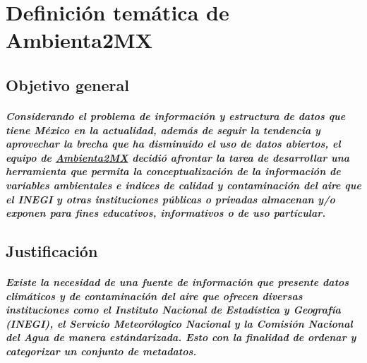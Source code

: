 \chapter {Definici\'on tem\'atica de Ambienta2MX}
  \section {Objetivo general}
    \paragraph {Considerando el problema de informaci\'on y estructura de datos que tiene M\'exico en la actualidad, adem\'as de seguir la tendencia y aprovechar la brecha que ha disminuido el uso de datos abiertos, el equipo de \underline{Ambienta2MX} decidi\'o afrontar la tarea de desarrollar una herramienta que permita la conceptualizaci\'on de la informaci\'on de variables ambientales e indices de calidad y contaminaci\'on del aire que el INEGI y otras instituciones p\'ublicas o privadas almacenan y/o exponen para fines educativos, informativos o de uso part\'icular.}
  
  \section{Justificación}
    \paragraph{Existe la necesidad de una fuente de información que presente datos climáticos y de contaminación del aire que ofrecen diversas instituciones como el Instituto Nacional de Estadística y Geografía (INEGI), el Servicio Meteorólogico Nacional y la Comisión Nacional del Agua de manera estándarizada.
               Esto con la finalidad de ordenar y categorizar un conjunto de metadatos.}
